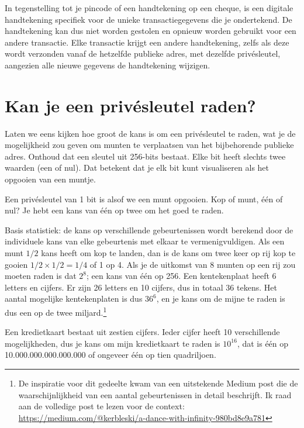 In tegenstelling tot je pincode of een handtekening op een cheque, is een digitale handtekening specifiek voor de unieke transactiegegevens die je ondertekend. De handtekening kan dus niet worden gestolen en opnieuw worden gebruikt voor een andere transactie. Elke transactie krijgt een andere handtekening, zelfs als deze wordt verzonden vanaf de hetzelfde publieke adres, met dezelfde privésleutel, aangezien alle nieuwe gegevens de handtekening wijzigen.


\section[Kan je een privésleutel raden?]{Kan je een privésleutel raden?}

Laten we eens kijken hoe groot de kans is om een privésleutel te raden, wat je de mogelijkheid zou geven om munten te verplaatsen van het bijbehorende publieke adres. Onthoud dat een sleutel uit 256-bits bestaat. Elke bit heeft slechts twee waarden (een of nul). Dat betekent dat je elk bit kunt visualiseren als het opgooien van een muntje.

Een privésleutel van 1 bit is alsof we een munt opgooien. Kop of munt, één of nul? Je hebt een kans van één op twee om het goed te raden.

Basis statistiek: de kans op verschillende gebeurtenissen wordt berekend door de individuele kans van elke gebeurtenis met elkaar te vermenigvuldigen. Als een munt $1/2$ kans heeft om kop te landen, dan is de kans om twee keer op rij kop te gooien $1/2 \times 1/2 = 1/4$ of 1 op 4. Als je de uitkomst van 8 munten op een rij zou moeten raden is dat $2^{8}$; een kans van één op 256. Een kentekenplaat heeft 6 letters en cijfers. Er zijn 26 letters en 10 cijfers, dus in totaal 36 tekens. Het aantal mogelijke kentekenplaten is dus $36^{6}$, en je kans om de mijne te raden is dus een op de twee miljard.\footnote{De inspiratie voor dit gedeelte kwam van een uitstekende Medium post die de waarschijnlijkheid van een aantal gebeurtenissen in detail beschrijft. Ik raad aan de volledige post te lezen voor de context: \href{https://medium.com/@kerbleski/a-dance-with-infinity-980bd8e9a781}{https://medium.com/@kerbleski/a-dance-with-infinity-980bd8e9a781}}

Een kredietkaart bestaat uit zestien cijfers. Ieder cijfer heeft 10 verschillende mogelijkheden, dus je kans om mijn kredietkaart te raden is $10^{16}$, dat is één op 10.000.000.000.000.000 of ongeveer één op tien quadriljoen.

